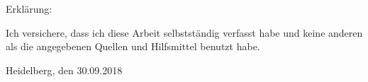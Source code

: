 \setlength{\parindent}{0em}

Erkl\"{a}rung:\par
\vspace{3\baselineskip}
Ich versichere, dass ich diese Arbeit selbstst\"{a}ndig verfasst habe und keine
anderen als die angegebenen Quellen und Hilfsmittel benutzt habe.\par
\vspace{5\baselineskip}
Heidelberg, den 30.09.2018\hspace{3cm}\dotfill
